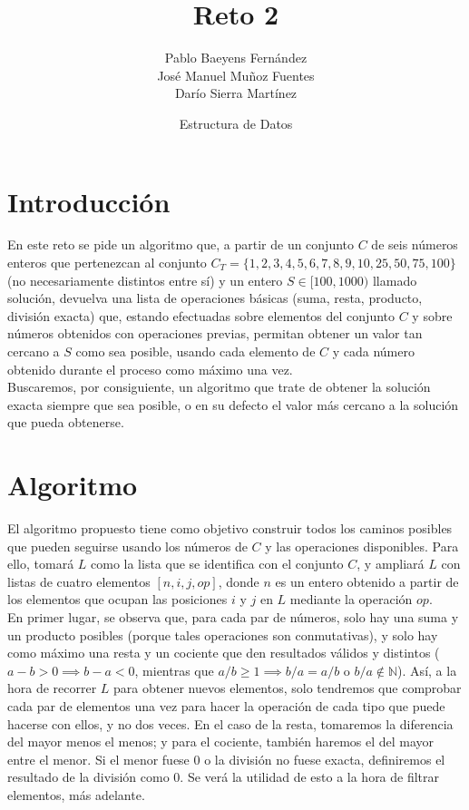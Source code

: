 \documentclass{article}
\title{Reto 2}
\date{Estructura de Datos}
\author{Pablo Baeyens Fernández\\José Manuel Muñoz Fuentes\\Darío Sierra Martínez}
\begin{document}
\maketitle

\section{Introducción}
En este reto se pide un algoritmo que, a partir de un conjunto $C$ de seis números enteros que
pertenezcan al conjunto $C_T = \{1, 2, 3, 4, 5, 6, 7, 8, 9, 10, 25, 50, 75, 100\}$ (no necesariamente distintos entre sí)
y un entero $S \in [100, 1000)$ llamado solución, devuelva una lista de
operaciones básicas (suma, resta, producto, división exacta) que, estando
efectuadas sobre elementos del conjunto $C$ y sobre números obtenidos con
operaciones previas, permitan obtener un valor tan cercano a $S$ como sea
posible, usando cada elemento de $C$ y cada número obtenido durante el proceso como máximo una vez. \\

Buscaremos, por consiguiente, un algoritmo que trate de obtener la solución
exacta siempre que sea posible, o en su defecto el valor más cercano a la solución que
pueda obtenerse.

\section{Algoritmo}
El algoritmo propuesto tiene como objetivo construir todos los caminos posibles que pueden seguirse usando los números de $C$ y las operaciones disponibles. Para ello, tomará $L$ como la lista que se
identifica con el conjunto $C$, y ampliará $L$ con listas de cuatro elementos
$[n, i, j, op]$, donde $n$ es un entero obtenido a partir de los elementos que ocupan
las posiciones $i$ y $j$ en $L$ mediante la operación $op$.\\

En primer lugar, se observa que, para cada par de números, solo hay una suma y un producto posibles (porque tales operaciones son conmutativas), y solo hay como máximo una resta y un cociente que den resultados válidos y distintos ($a-b > 0 \implies b - a < 0$, mientras que $a/b \ge 1 \implies b/a = a/b$ o $b/a \notin \mathds N$). Así, a la hora de recorrer $L$ para obtener nuevos elementos, solo tendremos que comprobar cada par de elementos una vez para hacer la operación de cada tipo que puede hacerse con ellos, y no dos veces. En el caso de la resta, tomaremos la diferencia del mayor menos el menos; y para el cociente, también haremos el del mayor entre el menor. Si el menor fuese $0$ o la división no fuese exacta, definiremos el resultado de la división como $0$. Se verá la utilidad de esto a la hora de filtrar elementos, más adelante. \\
\end{document}

